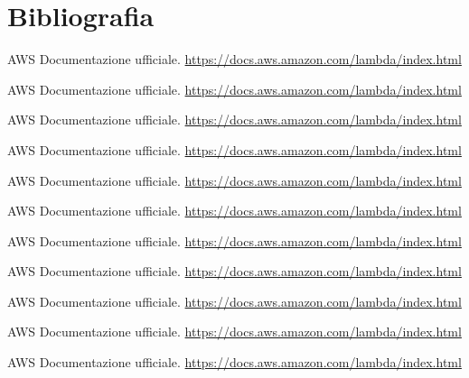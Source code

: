 \documentclass[12pt]{article}
\begin{document}
\thispagestyle{empty}
\newpage 

\section*{Bibliografia}

\begin{thebibliography}{9}
  AWS Documentazione ufficiale.
  \url{https://docs.aws.amazon.com/lambda/index.html}

  AWS Documentazione ufficiale.
  \url{https://docs.aws.amazon.com/lambda/index.html}

  AWS Documentazione ufficiale.
  \url{https://docs.aws.amazon.com/lambda/index.html}

  AWS Documentazione ufficiale.
  \url{https://docs.aws.amazon.com/lambda/index.html}

  AWS Documentazione ufficiale.
  \url{https://docs.aws.amazon.com/lambda/index.html}

  AWS Documentazione ufficiale.
  \url{https://docs.aws.amazon.com/lambda/index.html}

  AWS Documentazione ufficiale.
  \url{https://docs.aws.amazon.com/lambda/index.html}

  AWS Documentazione ufficiale.
  \url{https://docs.aws.amazon.com/lambda/index.html}

  AWS Documentazione ufficiale.
  \url{https://docs.aws.amazon.com/lambda/index.html}

  AWS Documentazione ufficiale.
  \url{https://docs.aws.amazon.com/lambda/index.html}

  AWS Documentazione ufficiale.
  \url{https://docs.aws.amazon.com/lambda/index.html}

\end{thebibliography}
\end{document}
